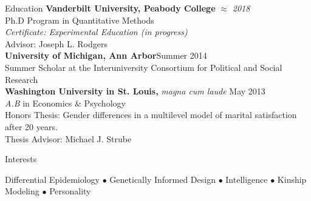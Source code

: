 \documentclass {resume}
\begin{document}
\nonfrenchspacing
\thispagestyle{myheadings}
\markright{\em{\textrm \today}}

\begin{rSection}{\textrm{Education}}
{\bf Vanderbilt University, Peabody College } \hfill  {\em $\approx$ 2018} \\
Ph.D Program in Quantitative Methods %
\\
\hspace* {3 mm}\textit{Certificate: Experimental Education (in progress)}\\
\hspace* {3 mm}Advisor: Joseph L. Rodgers\medskip\\
\textbf{University of Michigan, Ann Arbor}\hfill Summer 2014\\ 
Summer Scholar at the Interuniversity Consortium for Political and Social Research\medskip\\
{\bf Washington University in St. Louis, }\textit{magna cum laude} \hfill  {May 2013} \\ 
{\em A.B} in Economics \& Psychology\\
\hspace* {3 mm}Honors Thesis: Gender differences in a multilevel model of marital satisfaction after 20 years.  \\
\hspace* {3 mm}Thesis Advisor: Michael J. Strube%

\end{rSection}
\begin{rSection}{\textrm{Interests}} \begin{center}Differential Epidemiology $\bullet$ Genetically Informed Design $\bullet$ Intelligence $\bullet$ Kinship Modeling $\bullet$ Personality\end{center}
\end{rSection}
\end{document}
